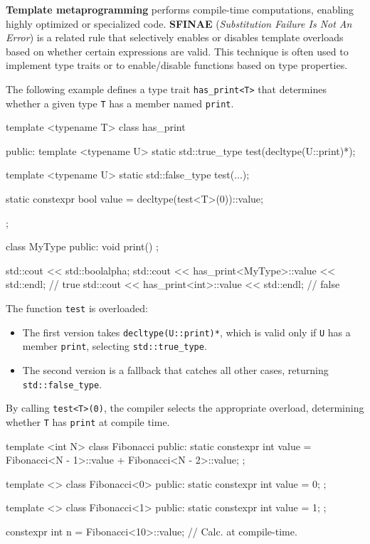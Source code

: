 \textbf{Template metaprogramming} performs compile-time computations, enabling highly optimized or specialized code. \textbf{SFINAE} (\textit{Substitution Failure Is Not An Error}) is a related rule that selectively enables or disables template overloads based on whether certain expressions are valid. This technique is often used to implement type traits or to enable/disable functions based on type properties.

The following example defines a type trait \texttt{has\_print<T>} that determines whether a given type \texttt{T} has a member named \texttt{print}.

\begin{exampleblock}
\begin{codeblock}[language=C++]
template <typename T>
class has_print {
public:
    template <typename U>
    static std::true_type test(decltype(U::print)*);

    template <typename U>
    static std::false_type test(...);

    static constexpr bool value = decltype(test<T>(0))::value;
};

class MyType {
public:
    void print() {}
};

std::cout << std::boolalpha;
std::cout << has_print<MyType>::value << std::endl; // true
std::cout << has_print<int>::value << std::endl;    // false
\end{codeblock}
\end{exampleblock}

    The function \texttt{test} is overloaded:
\begin{itemize}
    \item The first version takes \texttt{decltype(U::print)*}, which is valid only if \texttt{U} has a member \texttt{print}, selecting \texttt{std::true\_type}.
    \item The second version is a fallback that catches all other cases, returning \texttt{std::false\_type}.
\end{itemize}
By calling \texttt{test<T>(0)}, the compiler selects the appropriate overload, determining whether \texttt{T} has \texttt{print} at compile time.

\begin{exampleblock}
\begin{codeblock}[language=C++, numbers=none]
template <int N>
class Fibonacci {
public:
    static constexpr int value = Fibonacci<N - 1>::value + Fibonacci<N - 2>::value;
};

template <>
class Fibonacci<0> {
public:
    static constexpr int value = 0;
};

template <>
class Fibonacci<1> {
public:
    static constexpr int value = 1;
};

constexpr int n = Fibonacci<10>::value; // Calc. at compile-time.
\end{codeblock}
\end{exampleblock}


